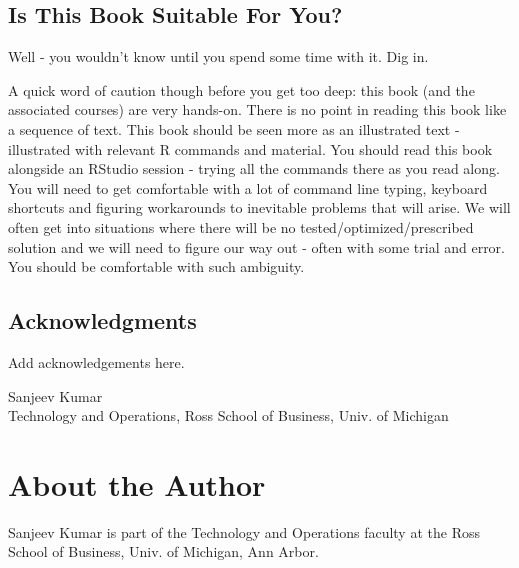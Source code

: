 \documentclass[]{krantz}
\theoremstyle{definition}
\theoremstyle{definition}
\theoremstyle{definition}
\theoremstyle{remark}
\let\BeginKnitrBlock\begin \let\EndKnitrBlock\end
\begin{document}
\section*{Is This Book Suitable For
You?}\label{is-this-book-suitable-for-you}


Well - you wouldn't know until you spend some time with it. Dig in.

A quick word of caution though before you get too deep: this book (and
the associated courses) are very hands-on. There is no point in reading
this book like a sequence of text. This book should be seen more as an
illustrated text - illustrated with relevant R commands and material.
You should read this book alongside an RStudio session - trying all the
commands there as you read along. You will need to get comfortable with
a lot of command line typing, keyboard shortcuts and figuring
workarounds to inevitable problems that will arise. We will often get
into situations where there will be no tested/optimized/prescribed
solution and we will need to figure our way out - often with some trial
and error. You should be comfortable with such ambiguity.

\section*{Acknowledgments}\label{acknowledgments}


Add acknowledgements here.

\BeginKnitrBlock{flushright}
Sanjeev Kumar\\
Technology and Operations, Ross School of Business, Univ. of Michigan
\EndKnitrBlock{flushright}

\chapter*{About the Author}\label{about-the-author}


Sanjeev Kumar is part of the Technology and Operations faculty at the
Ross School of Business, Univ. of Michigan, Ann Arbor.
\end{document}
